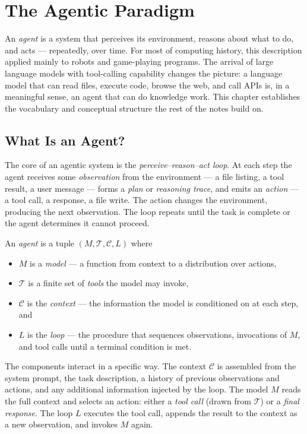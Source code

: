 \chapter{The Agentic Paradigm}

An \emph{agent} is a system that perceives its environment, reasons about what to do, and acts — repeatedly, over time.
For most of computing history, this description applied mainly to robots and game-playing programs.
The arrival of large language models with tool-calling capability changes the picture: a language model that can read files, execute code, browse the web, and call APIs is, in a meaningful sense, an agent that can do knowledge work.
This chapter establishes the vocabulary and conceptual structure the rest of the notes build on.

\section{What Is an Agent?}

The core of an agentic system is the \emph{perceive–reason–act loop}.
At each step the agent receives some \emph{observation} from the environment — a file listing, a tool result, a user message — forms a \emph{plan} or \emph{reasoning trace}, and emits an \emph{action} — a tool call, a response, a file write.
The action changes the environment, producing the next observation.
The loop repeats until the task is complete or the agent determines it cannot proceed.

\begin{definition}
An \emph{agent} is a tuple $(M, \mathcal{T}, \mathcal{C}, L)$ where
\begin{itemize}
\item $M$ is a \emph{model} — a function from context to a distribution over actions,
\item $\mathcal{T}$ is a finite set of \emph{tools} the model may invoke,
\item $\mathcal{C}$ is the \emph{context} — the information the model is conditioned on at each step, and
\item $L$ is the \emph{loop} — the procedure that sequences observations, invocations of $M$, and tool calls until a terminal condition is met.
\end{itemize}
\end{definition}

The components interact in a specific way.
The context $\mathcal{C}$ is assembled from the system prompt, the task description, a history of previous observations and actions, and any additional information injected by the loop.
The model $M$ reads the full context and selects an action: either a \emph{tool call} (drawn from $\mathcal{T}$) or a \emph{final response}.
The loop $L$ executes the tool call, appends the result to the context as a new observation, and invokes $M$ again.

